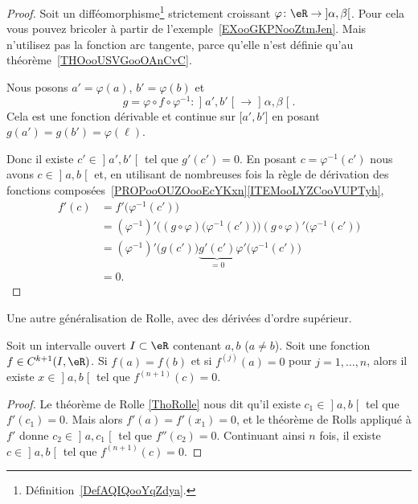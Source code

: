 \begin{proof}
    Soit un difféomorphisme\footnote{Définition~\ref{DefAQIQooYqZdya}.} strictement croissant \( \varphi\colon \eR\to \mathopen] \alpha , \beta \mathclose[\). Pour cela vous pouvez bricoler à partir de l'exemple~\ref{EXooGKPNooZtmJen}.
        Mais n'utilisez pas la fonction arc tangente, parce qu'elle n'est définie qu'au théorème~\ref{THOooUSVGooOAnCvC}.

    Nous posons \( a'=\varphi(a)\), \( b'=\varphi(b)\) et
    \begin{equation}
    g= \varphi\circ f\circ \varphi^{-1}\colon \mathopen] a' , b' \mathclose[\to \mathopen] \alpha , \beta \mathclose[.
    \end{equation}
    Cela est une fonction dérivable et continue sur \( \mathopen[ a' , b' \mathclose]\) en posant \( g(a')=g(b')=\varphi(\ell)\).

    Donc il existe \( c'\in\mathopen] a' , b' \mathclose[\) tel que \( g'(c')=0\). En posant \( c=\varphi^{-1}(c')\) nous avons \( c\in \mathopen] a , b \mathclose[\) et, en utilisant de nombreuses fois la règle de dérivation des fonctions composées~\ref{PROPooOUZOooEcYKxn}\ref{ITEMooLYZCooVUPTyh},
    \begin{subequations}
        \begin{align}
            f'(c)&=f'\big( \varphi^{-1}(c') \big)\\
            &=(\varphi^{-1})'\Big( (g\circ \varphi)\big( \varphi^{-1}(c') \big) \Big)(g\circ\varphi)'\big( \varphi^{-1}(c') \big)\\
            &=(\varphi^{-1})'\big( g(c') \big)\underbrace{g'(c')}_{=0}\varphi'\big( \varphi^{-1}(c') \big)\\
            &=0.
        \end{align}
    \end{subequations}
\end{proof}

Une autre généralisation de Rolle, avec des dérivées d'ordre supérieur.
\begin{proposition}      \label{PROPooCPCAooJjOZNy}
Soit un intervalle ouvert \( I\subset \eR\) contenant \( a,b\) (\( a\neq b\)). Soit une fonction \( f\in C^{k+1}(I,\eR)\). Si \( f(a)=f(b)\) et si \( f^{(j)}(a)=0\) pour \( j=1,\ldots, n\), alors il existe \( x\in \mathopen] a , b \mathclose[\) tel que \( f^{(n+1)}(c)=0\).
\end{proposition}

\begin{proof}
    Le théorème de Rolle \ref{ThoRolle} nous dit qu'il existe \( c_1\in \mathopen] a , b \mathclose[\) tel que \( f'(c_1)=0\). Mais alors \( f'(a)=f'(x_1)=0\), et le théorème de Rolls appliqué à \( f'\) donne \( c_2\in \mathopen] a , c_1 \mathclose[\) tel que \( f''(c_2)=0\). Continuant ainsi \( n\) fois, il existe \( c\in \mathopen] a ,b\mathclose[\) tel que \( f^{(n+1)}(c)=0\).
\end{proof}

